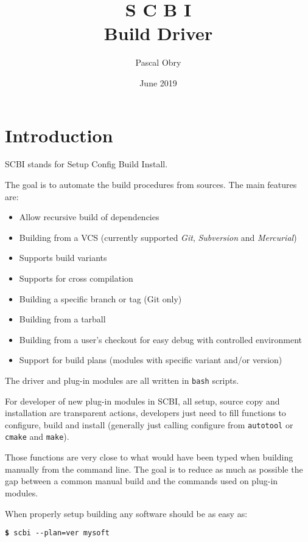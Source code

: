 \documentclass[a4paper,12pt,twoside]{article}
\title{\huge{S C B I} \\ Build Driver}
\author{Pascal Obry}
\date{June 2019}
\newcommand{\code}[1]{\texttt{#1}}
\renewcommand{\emph}[1]{\textit{#1}}
\newcommand{\cmd}[1]{\tabto{1cm}\hspace{0.5cm}\texttt{\textbf{\$} #1}}
\let\stdsection\section
\renewcommand\section{\newpage\stdsection}
\newcommand{\ddash}{-{}-}
\begin{document}
\maketitle

\tableofcontents


\section{Introduction}

SCBI stands for Setup Config Build Install.

The goal is to automate the build procedures from sources. The main features are:

\begin{itemize}
	\item Allow recursive build of dependencies
	\item Building from a VCS (currently supported \emph{Git}, \emph{Subversion} and \emph{Mercurial})
	\item Supports build variants
	\item Supports for cross compilation
	\item Building a specific branch or tag (Git only)
	\item Building from a tarball
	\item Building from a user's checkout for easy debug with controlled environment
	\item Support for build plans (modules with specific variant and/or version)
\end{itemize}

The driver and plug-in modules are all written in \code{bash} scripts.

For developer of new plug-in modules in SCBI, all setup, source copy and installation are transparent actions, developers just need to fill functions to configure, build and install (generally just calling configure from \code{autotool} or \code{cmake} and \code{make}).

Those functions are very close to what would have been typed when building manually from the command line. The goal is to reduce as much as possible the gap between a common manual build and the commands used on plug-in modules.

When properly setup building any software should be as easy as:

\cmd{scbi \ddash{}plan=ver mysoft}
\end{document}

